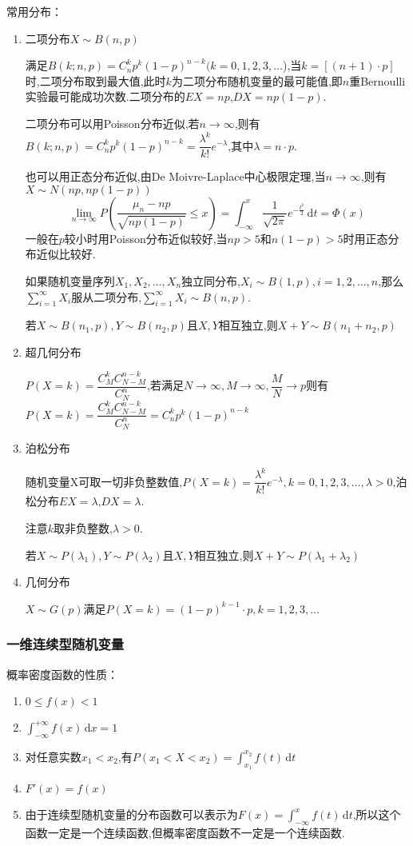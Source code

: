 常用分布：
\begin{enumerate}[fullwidth,itemindent=2em,listparindent=2em]
\item 二项分布$X\sim B(n,p)$

满足$B(k;n,p)=C^k_np^k(1-p)^{n-k}(k=0,1,2,3,\dots$),当$k=[(n+1)\cdot p]$时,二项分布取到最大值,此时$k$为二项分布随机变量的最可能值,即$n$重Bernoulli实验最可能成功次数.二项分布的$EX=np$,$DX=np(1-p)$.

二项分布可以用Poisson分布近似,若$n\to \infty$,则有$B(k;n,p)=C^k_np^k(1-p)^{n-k}=\dfrac{\lambda ^k}{k!}e^{-\lambda}$,其中$\lambda=n\cdot p$.

也可以用正态分布近似,由De Moivre-Laplace中心极限定理,当$n\to \infty$,则有$X\sim N(np,np(1-p))$
\begin{equation*}
    \lim_{n \to \infty}P\left(\frac{\mu_n-np}{\sqrt{np(1-p)}}\leqslant x \right)=\int_{-\infty}^{x}\frac{1}{\sqrt{2\pi}}e^{-\frac{t^2}{2}}  \,\mathrm{d} t =\varPhi (x)
\end{equation*}
一般在$p$较小时用Poisson分布近似较好,当$np>5$和$n(1-p)>5$时用正态分布近似比较好.

如果随机变量序列$X_1,X_2,\dots,X_n$独立同分布,$X_i\sim B(1,p),i=1,2,\dots,n$,那么$\sum_{i=1}^{\infty} X_i$服从二项分布,$\sum_{i=1}^{\infty} X_i \sim B(n,p)$.

若$X\sim B(n_1,p),Y\sim B(n_2,p)$且$X,Y$相互独立,则$X+Y\sim B(n_1+n_2,p)$
\item 超几何分布

$P(X=k)=\dfrac{C^k_MC_{N-M}^{n-k}}{C_N^n}$,若满足$N\to \infty,M \to \infty,\dfrac{M}{N}\to p$则有$P(X=k)=\dfrac{C^k_MC_{N-M}^{n-k}}{C_N^n}=C^k_np^k(1-p)^{n-k}$

\item 泊松分布

随机变量X可取一切非负整数值,$P(X=k)=\dfrac{\lambda^k}{k!}e^{-\lambda},k=0,1,2,3,\dots,\lambda>0$,泊松分布$EX=\lambda$,$DX=\lambda$.

注意$k$取非负整数,$\lambda>0$.

若$X\sim P(\lambda_1),Y\sim P(\lambda_2)$且$X,Y$相互独立,则$X+Y\sim P(\lambda_1+\lambda_2)$

\item 几何分布

$X\sim G(p)$满足$P(X=k)=(1-p)^{k-1}\cdot p,k=1,2,3,\dots$
\end{enumerate}

\subsubsection{一维连续型随机变量}
概率密度函数的性质：
\begin{enumerate}
    \item $0 \leqslant f(x) <1$
    \item $\int_{-\infty}^{+\infty} f(x) \,\mathrm{d}x =1$
    \item 对任意实数$x_1 < x_2$,有$P(x_1<X<x_2)=\int_{x_1}^{x_2} f(t) \,\mathrm{d}t $
    \item $F'(x)=f(x)$
    \item 由于连续型随机变量的分布函数可以表示为$F(x)=\int_{-\infty}^{x} f(t) \,\mathrm{d}t $,所以这个函数一定是一个连续函数,但概率密度函数不一定是一个连续函数.
\end{enumerate}

